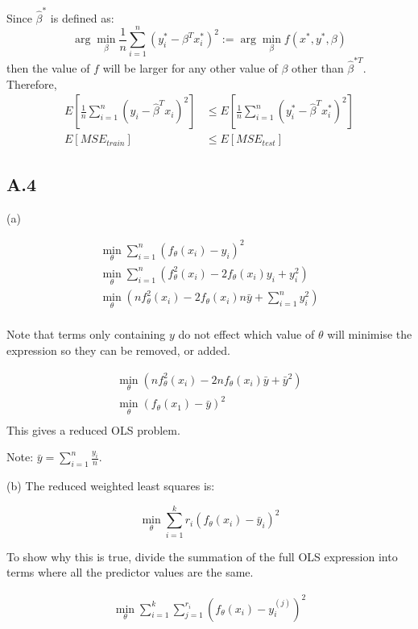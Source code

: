 \documentclass{article}
\begin{document}
    Since $\hat{\beta}^{*}$ is defined as:
    \[\arg\min_{\beta}\frac{1}{n} \sum_{i=1}^n (y^*_i-\beta^Tx^*_i)^2 := \arg\min_{\beta} f(x^*, y^*, \beta)\] 
    then the value of $f$ will be larger for any other value of $\beta$ other than $\hat{\beta}^{*T}$.
    Therefore,
    \[
        \begin{aligned}
            E\left[\frac{1}{n} \sum_{i=1}^n (y_i-\hat{\beta}^Tx_i)^2 \right] &\leq E\left[\frac{1}{n} \sum_{i=1}^n (y^*_i-\hat{\beta}^Tx^*_i)^2 \right]\\
            E[MSE_{train}] &\leq E[MSE_{test}]
        \end{aligned}
    \]

    \subsection{A.4}

    (a) 
    
    \[
    \begin{aligned}
        \min_\theta \sum_{i=1}^n(f_\theta(x_i)-y_i)^2\\
        \min_\theta \sum_{i=1}^n(f^2_\theta(x_i)-2f_\theta(x_i)y_i+y_i^2)\\ 
        \min_\theta (nf^2_\theta(x_i)-2f_\theta(x_i)n\bar{y}+\sum_{i=1}^ny_i^2)\\ 
    \end{aligned}
    \]

    Note that terms only containing $y$ do not effect which value of $\theta$ will minimise 
    the expression so they can be removed, or added.

    \[
        \begin{aligned}
            \min_\theta (nf^2_\theta(x_i)-2nf_\theta(x_i)\bar{y}+\bar{y}^2)\\ 
            \min_\theta (f_\theta(x_1)-\bar{y})^2\\
        \end{aligned}
        \]
    This gives a reduced OLS problem.
    
    Note: $\bar{y}=\sum_{i=1}^n \frac{y_i}{n}$.

    (b) The reduced weighted least squares is:

    \[\min_\theta \sum_{i=1}^k {r_i} \left( f_\theta(x_i)-\bar{y}_i\right)^2\]
    

    To show why this is true, divide the summation of the full OLS expression 
    into terms where all the predictor values are the same.

    \[
    \begin{aligned}
        \min_\theta \sum_{i=1}^k \sum_{j=1}^{r_i}(f_\theta(x_i)-y_i^{(j)})^2\\
    \end{aligned}
    \]
\end{document}
